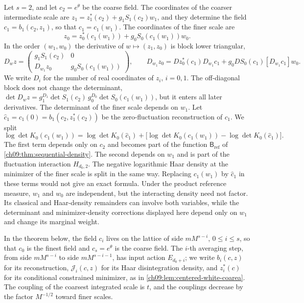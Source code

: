 \begin{example}\label{ch09:ex:two-steps}
Let $s=2$, and let $c_2=e^\theta$ be the coarse field. The coordinates of the coarser intermediate scale are $z_1=z_1^*(c_2)+g_1S_1(c_2)w_1$, and they determine the field $c_1=b_1(c_2,z_1)$, so that $c_1=c_1(w_1)$. The coordinates of the finer scale are
\[
 z_0=z_0^*(c_1(w_1))+g_0S_0(c_1(w_1))w_0.
\]
In the order $(w_1,w_0)$ the derivative of $w\mapsto(z_1,z_0)$ is block lower triangular,
\[
 D_wz=\begin{pmatrix}g_1S_1(c_2)&0\\ D_{w_1}z_0&g_0S_0(c_1(w_1))\end{pmatrix},\qquad
 D_{w_1}z_0=Dz_0^*(c_1)D_{w_1}c_1+g_0DS_0(c_1)[D_{w_1}c_1]w_0.
\]
We write $D_i$ for the number of real coordinates of $z_i$, $i=0,1$. The off-diagonal block does not change the determinant, $\det D_wz=g_1^{D_1}\det S_1(c_2)\,g_0^{D_0}\det S_0(c_1(w_1))$, but it enters all later derivatives. The determinant of the finer scale depends on $w_1$. Let $\widehat c_1=c_1(0)=b_1(c_2,z_1^*(c_2))$ be the zero-fluctuation reconstruction of $c_1$. We split
\[
 \log\det K_0(c_1(w_1))=\log\det K_0(\widehat c_1)+\bigl[\log\det K_0(c_1(w_1))-\log\det K_0(\widehat c_1)\bigr].
\]
The first term depends only on $c_2$ and becomes part of the function $\mathsf B_{\mathrm{ref}}$ of \cref{ch09:thm:sequential-density}. The second depends on $w_1$ and is part of the fluctuation interaction $H_{d_0,2}$. The negative logarithmic Haar density at the minimizer of the finer scale is split in the same way. Replacing $c_1(w_1)$ by $\widehat c_1$ in these terms would not give an exact formula. Under the product reference measure, $w_1$ and $w_0$ are independent, but the interacting density need not factor. Its classical and Haar-density remainders can involve both variables, while the determinant and minimizer-density corrections displayed here depend only on $w_1$ and change its marginal weight.
\end{example}

In the theorem below, the field $c_i$ lives on the lattice of side $mM^{s-i}$, $0\le i\le s$, so that $c_0$ is the finest field and $c_s=e^\theta$ is the coarse field. The $i$-th averaging step, from side $mM^{s-i}$ to side $mM^{s-i-1}$, has input action $E_{d_0+i}$; we write $b_i(c,z)$ for its reconstruction, $\mathcal J_i(c,z)$ for its Haar disintegration density, and $z_i^*(c)$ for its conditional constrained minimizer, as in \cref{ch09:lem:centered-white-coarea}. The coupling of the coarsest integrated scale is $t$, and the couplings decrease by the factor $M^{-1/2}$ toward finer scales.

